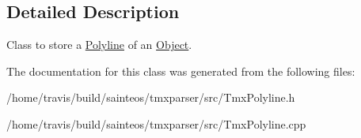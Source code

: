 \subsection{Detailed Description}
Class to store a \hyperlink{classTmx_1_1Polyline}{Polyline} of an \hyperlink{classTmx_1_1Object}{Object}. 

The documentation for this class was generated from the following files\-:\begin{DoxyCompactItemize}
\item 
/home/travis/build/sainteos/tmxparser/src/Tmx\-Polyline.\-h\item 
/home/travis/build/sainteos/tmxparser/src/Tmx\-Polyline.\-cpp\end{DoxyCompactItemize}
